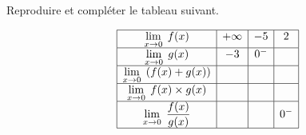 



 \summary{}
 
	\begin{exercice}
Reproduire et compléter le tableau suivant.



 $$\begin{array}{|c|c|c|c|}
\hline
 \displaystyle \lim_{x\to 0}\;f(x)  &   + \infty &    -5  & 2  \\\hline
 \displaystyle \lim_{x\to 0}\;g(x)  &  -3  &   0^{-} &\\\hline
   \displaystyle \lim_{x\to 0}\;\left(f(x)+g(x)\right)  & &&\\\hline
   \displaystyle \lim_{x\to 0}\;f(x)\times g(x)  &   &   &\\\hline
  \displaystyle \lim_{x\to 0}\;{\frac{f(x)}{g(x)}}  &  &  & 0^- \\\hline
\end{array}$$
 \end{exercice}
 

